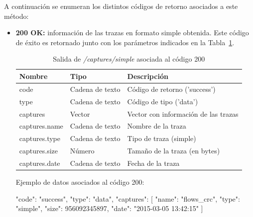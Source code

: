 A continuación se enumeran los distintos códigos de retorno asociados a este método:
\begin{itemize}

\item{\textbf{200 OK:} información de las \glspl{traza} en formato \gls{simple} obtenida.
Este código de éxito es retornado junto con los parámetros indicados en la Tabla~\ref{extra:api:capturessimple:ok}.
\begin{table}[H]
\centering
\begin{tabular}{|l|l|l|}
\hline
\rowcolor[HTML]{F5F5F5}
\textbf{Nombre}                & \textbf{Tipo}   & \textbf{Descripción}                            \\ \hline
code                           & Cadena de texto & Código de retorno ('success')                   \\ \hline
type                           & Cadena de texto & Código de tipo ('data')                         \\ \hline
captures                       & Vector          & Vector con información de las \glspl{traza}     \\ \hline
captures.name                  & Cadena de texto & Nombre de la \gls{traza}                        \\ \hline
captures.type                  & Cadena de texto & Tipo de \gls{traza} (\gls{simple})              \\ \hline
captures.size                  & Número          & Tamaño de la \gls{traza} (en bytes)             \\ \hline
captures.date                  & Cadena de texto & Fecha de la \gls{traza}                         \\ \hline
\end{tabular}
\caption{Salida de \textit{/captures/simple} asociada al código 200}
\label{extra:api:capturessimple:ok}
\end{table}
\begin{minipage}{\textwidth}
Ejemplo de datos asociados al código 200:

\begin{code}[language=json]
{
  "code": "success",
  "type": "data",
  "captures": [
    {
      "name": "flows_crc",
      "type": "simple",
      "size": 956092345897,
      "date": "2015-03-05 13:42:15"
    }
  ]
}
\end{code}
\end{minipage}
}

\end{itemize}

